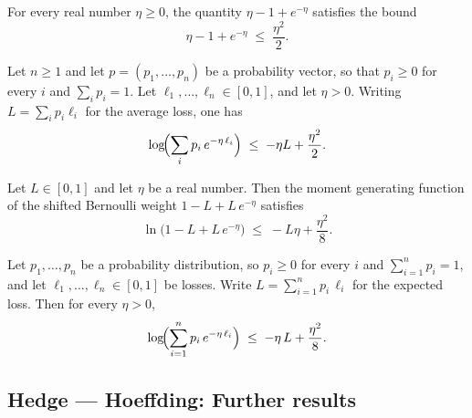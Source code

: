\begin{theorem}
\label{eta_exp_bound}
\leanok
{}
For every real number $\eta \ge 0$, the quantity $\eta - 1 + e^{-\eta}$ satisfies the
bound
\[
  \eta - 1 + e^{-\eta} \;\le\; \frac{\eta^2}{2}.
\]
\end{theorem}

\begin{theorem}
\label{hoeffding_log_mgf_weak}
\leanok
{}
Let $n \ge 1$ and let $p = (p_1, \dots, p_n)$ be a probability vector, so that $p_i \ge
0$ for every $i$ and $\sum_{i} p_i = 1$. Let $\ell_1, \dots, \ell_n \in [0,1]$, and let
$\eta > 0$. Writing $L = \sum_{i} p_i \ell_i$ for the average loss, one has
\[
  \log\!\Bigl(\sum_{i} p_i\, e^{-\eta\, \ell_i}\Bigr)
  \;\le\;
  -\eta L + \frac{\eta^2}{2}.
\]
\end{theorem}

\begin{theorem}
\label{bernoulli_mgf_bound}
\leanok
{}
Let $L \in [0,1]$ and let $\eta$ be a real number. Then the moment generating function
of the shifted Bernoulli weight $1 - L + L\,e^{-\eta}$ satisfies
\[
  \ln\!\bigl(1 - L + L\,e^{-\eta}\bigr)
  \;\le\;
  -L\eta + \frac{\eta^2}{8}.
\]
\end{theorem}

\begin{theorem}
\label{hoeffding_log_mgf_tight}
\leanok
{}
Let $p_1,\dots,p_n$ be a probability distribution, so $p_i \ge 0$ for every $i$ and
$\sum_{i=1}^n p_i = 1$, and let $\ell_1,\dots,\ell_n \in [0,1]$ be losses. Write $L =
\sum_{i=1}^n p_i\,\ell_i$ for the expected loss. Then for every $\eta > 0$,
\[
  \log\!\Bigl(\sum_{i=1}^n p_i\,e^{-\eta\,\ell_i}\Bigr)
  \;\le\;
  -\eta\,L + \frac{\eta^2}{8}.
\]
\end{theorem}

\subsection*{Hedge --- Hoeffding: Further results}

